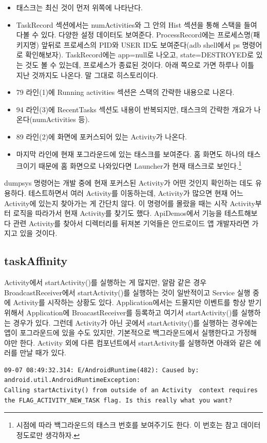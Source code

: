 \begin{itemize}
\item 태스크는 최신 것이 먼저 위쪽에 나타난다.
\item TaskRecord 섹션에서는 numActivities와 그 안의 Hist 섹션을 통해 스택을 들여다볼 수 있다. 다양한 설정 데이터도 보여준다. ProcessRecord에는 프로세스명(패키지명) 앞뒤로 프로세스의 PID와 USER ID도 보여준다(adb shell에서 ps 명령어로 확인해보자).
TaskRecord에는 app=null로 나오고, state=DESTROYED로 있는 것도 볼 수 있는데, 프로세스가 종료된 것이다. 아래 쪽으로 가면 하루나 이틀 지난 것까지도 나온다. 말 그대로 히스토리이다. 
\item 79 라인(1)에 Running activities 섹션은 스택의 간략한 내용으로 나온다.
\item 94 라인(3)에 RecentTasks 섹션도 내용이 반복되지만, 태스크의 간략한 개요가 나온다(numActivities 등).
\item 89 라인(2)에 화면에 포커스되어 있는 Activity가 나온다.
\item 마지막 라인에 현재 포그라운드에 있는 태스크를 보여준다. 홈 화면도 하나의 태스크이기 때문에 홈 화면으로 나와있다면 Launcher가 현재 태스크로 보인다.\footnote{시점에 따라 백그라운드의 태스크 번호를 보여주기도 한다. 이 번호는 참고 데이터 정도로만 생각하자.}
\end{itemize}
dumpsys 명령어는 개발 중에 현재 포커스된 Activity가 어떤 것인지 확인하는 데도 유용하다.
테스트하면서 여러 Activity를 이동하는데, Activity가 많으면 현재 어느 Activity에 있는지 찾아가는 게 간단치 않다.
이 명령어를 몰랐을 때는 시작 Activity부터 로직을 따라가서 현재 Activity를 찾기도 했다. ApiDemos에서 기능을 테스트해보다 관련 Activity를 찾아서 디렉터리를 뒤져본 기억들은 안드로이드 앱 개발자라면 가지고 있을 것이다.

\subsection{taskAffinity}
Activity에서 startActivity()를 실행하는 게 많지만, 알람 같은 경우 BroadcastReceiver에서 startActivity()를 실행하는 것이 일반적이고 Service 실행 중에 Activity를 시작하는 상황도 있다. Application에서는 드물지만 이벤트를 항상 받기 위해서 Application에 BroacastReceiver를 등록하고 여기서 startActivity()를 실행하는 경우가 있다.
그런데 Activity가 아닌 곳에서 startActivity()를 실행하는 경우에는 앱이 포그라운드에 있을 수도 있지만, 기본적으로 백그라운드에서 실행한다고 가정해야만 한다. Activity 외에 다른 컴포넌트에서 startActivity를 실행하면 아래와 같은 에러를 만날 때가 있다.
\begin{lstlisting}[frame=single]
09-07 08:49:32.314: E/AndroidRuntime(482): Caused by: android.util.AndroidRuntimeException: 
Calling startActivity() from outside of an Activity  context requires 
the FLAG_ACTIVITY_NEW_TASK flag. Is this really what you want?
\end{lstlisting}

